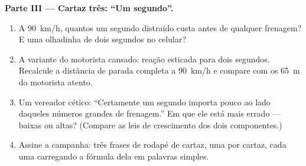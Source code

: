 \begin{problem}
\medskip\noindent\textbf{Parte III --- Cartaz três: ``Um segundo''.}
\begin{enumerate}[resume]
  \item A \qty{90}{km/h}, quantos  um segundo distraído custa
        antes de qualquer frenagem? E uma olhadinha de dois segundos
        no celular?
  \item A variante do motorista cansado: reação esticada para dois
        segundos. Recalcule a distância de parada completa a
        \qty{90}{km/h} e compare com os \qty{65}{m} do motorista
        atento.
  \item Um vereador cético: ``Certamente um segundo importa pouco ao
        lado daqueles números grandes de frenagem.'' Em que
         ele está mais errado --- baixas ou altas?
        (Compare as leis de crescimento dos dois componentes.)
  \item Assine a campanha: três frases de rodapé de cartaz, uma por
        cartaz, cada uma carregando a fórmula dela em palavras
        simples.
\end{enumerate}
\end{problem}
